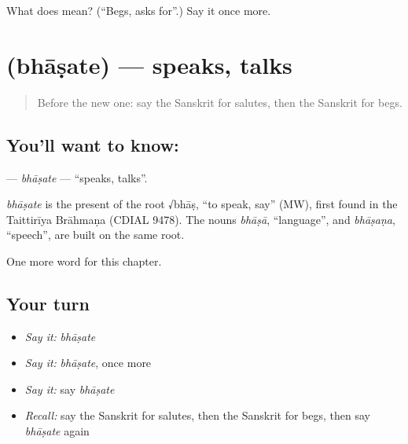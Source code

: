 \begin{tcolorbox}[breakable,colback=teal!4,colframe=teal!35!black,title={Before you move on}]
What does  mean? (\textquotedblleft{}Begs, asks for\textquotedblright{}.) Say it once more.
\end{tcolorbox}
\section[\texorpdfstring{\sk{भाषते} (bhāṣate)}{भाषते (bhāṣate)}]{ (bhāṣate) — speaks, talks}

\label{lesson:SA-C203-bhasate}



\begin{quote}
Before the new one: say the Sanskrit for salutes, then the Sanskrit for begs.
\end{quote}

\subsection*{You'll want to know: }
\textbf{} — \emph{bhāṣate} — \textquotedblleft{}speaks, talks\textquotedblright{}.

\begin{cousinweb}
\emph{bhāṣate} is the present of the root √bhāṣ, \textquotedblleft{}to speak, say\textquotedblright{} (MW), first found in the Taittirīya Brāhmaṇa (CDIAL 9478). The nouns \emph{bhāṣā}, \textquotedblleft{}language\textquotedblright{}, and \emph{bhāṣaṇa}, \textquotedblleft{}speech\textquotedblright{}, are built on the same root.
\end{cousinweb}

\begin{grammarlens}[title={What you've built}]
One more word for this chapter.
\end{grammarlens}

\subsection*{Your turn}
\begin{itemize}
\raggedright
  \item \emph{Say it:} \emph{bhāṣate}
  \item \emph{Say it:} \emph{bhāṣate}, once more
  \item \emph{Say it:} say \emph{bhāṣate}
  \item \emph{Recall:} say the Sanskrit for salutes, then the Sanskrit for begs, then say \emph{bhāṣate} again
\end{itemize}

